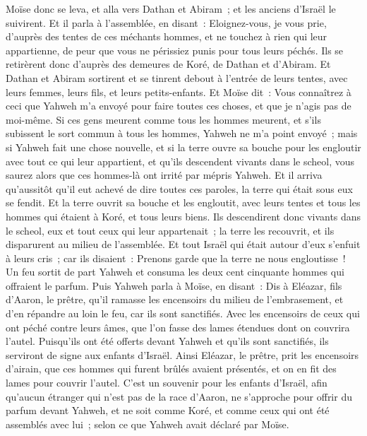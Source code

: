 \begin{multicols}{2}
Moïse donc se leva, et alla vers Dathan et Abiram~; et les anciens d'Israël le suivirent.
Et il parla à l'assemblée, en disant~: Eloignez-vous, je vous prie, d'auprès des tentes de ces méchants hommes, et ne touchez à rien qui leur appartienne, de peur que vous ne périssiez punis pour tous leurs péchés.
Ils se retirèrent donc d'auprès des demeures de Koré, de Dathan et d'Abiram. Et Dathan et Abiram sortirent et se tinrent debout à l'entrée de leurs tentes, avec leurs femmes, leurs fils, et leurs petits-enfants.
Et Moïse dit~: Vous connaîtrez à ceci que Yahweh m'a envoyé pour faire toutes ces choses, et que je n'agis pas de moi-même.
Si ces gens meurent comme tous les hommes meurent, et s'ils subissent le sort commun à tous les hommes, Yahweh ne m'a point envoyé~;
mais si Yahweh fait une chose nouvelle, et si la terre ouvre sa bouche pour les engloutir avec tout ce qui leur appartient, et qu'ils descendent vivants dans le scheol, vous saurez alors que ces hommes-là ont irrité par mépris Yahweh.
Et il arriva qu'aussitôt qu'il eut achevé de dire toutes ces paroles, la terre qui était sous eux se fendit.
Et la terre ouvrit sa bouche et les engloutit, avec leurs tentes et tous les hommes qui étaient à Koré, et tous leurs biens.
Ils descendirent donc vivants dans le scheol, eux et tout ceux qui leur appartenait~; la terre les recouvrit, et ils disparurent au milieu de l'assemblée.
Et tout Israël qui était autour d'eux s'enfuit à leurs cris~; car ils disaient~: Prenons garde que la terre ne nous engloutisse~!
Un feu sortit de part Yahweh et consuma les deux cent cinquante hommes qui offraient le parfum.
Puis Yahweh parla à Moïse, en disant~:
Dis à Eléazar, fils d'Aaron, le prêtre, qu'il ramasse les encensoirs du milieu de l'embrasement, et d'en répandre au loin le feu, car ils sont sanctifiés.
Avec les encensoirs de ceux qui ont péché contre leurs âmes, que l'on fasse des lames étendues dont on couvrira l'autel. Puisqu'ils ont été offerts devant Yahweh et qu'ils sont sanctifiés, ils serviront de signe aux enfants d'Israël.
Ainsi Eléazar, le prêtre, prit les encensoirs d'airain, que ces hommes qui furent brûlés avaient présentés, et on en fit des lames pour couvrir l'autel.
C'est un souvenir pour les enfants d'Israël, afin qu'aucun étranger qui n'est pas de la race d'Aaron, ne s'approche pour offrir du parfum devant Yahweh, et ne soit comme Koré, et comme ceux qui ont été assemblés avec lui~; selon ce que Yahweh avait déclaré par Moïse.

\end{multicols}

